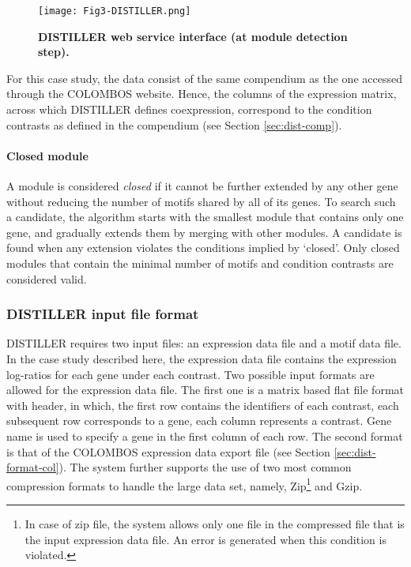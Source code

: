 \begin{figure}[tb]
	\centering
  	\texttt{[image: Fig3-DISTILLER.png]}
	\caption[DISTILLER web service interface]{\textbf{DISTILLER web service 
	interface (at module detection step).}}
	\label{fig:distiller}
\end{figure}

For this case study, the data consist of the same compendium as the one 
accessed through the COLOMBOS website. Hence, the columns of the expression 
matrix, across which DISTILLER defines coexpression, correspond to the 
condition contrasts as defined in the compendium (see Section 
\ref{sec:dist-comp}). 

\paragraph{Closed module}
A module is considered \textit{closed} if it cannot be further extended by any
other gene without reducing the number of motifs shared by all of its genes. To
search such a candidate, the algorithm \cite{Lemmens2009} starts with the
smallest module that contains only one gene, and gradually extends them by
merging with other modules. A candidate is found when any extension violates the
conditions implied by `closed'.  Only closed modules that contain the minimal
number of motifs and condition contrasts are considered valid.



\subsubsection{DISTILLER input file format}\label{sec:distiller-infile-format}
DISTILLER requires two input files: an expression data file and a motif data 
file. In the case study described here, the expression data file contains the 
expression log-ratios for each gene under each contrast. 
%
Two possible input formats are allowed for the expression data file.  The first
one is a matrix based flat file format with header, in which, the first row
contains the identifiers of each contrast, each subsequent row corresponds to a
gene, each column represents a contrast.  Gene name is used to specify a gene in
the first column of each row.
%
The second format is that of the COLOMBOS expression data export file (see
Section \ref{sec:dist-format-col}).  
%
The system further supports the use of two most common compression formats to
handle the large data set, namely, Zip\footnote{In case of zip file, the system
  allows only one file in the compressed file that is the input expression data
  file. An error is generated when this condition is violated.} and Gzip.


